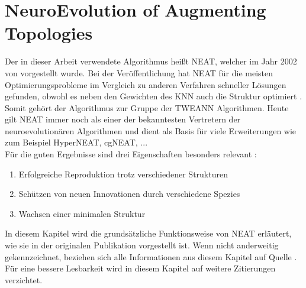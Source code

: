 \section{NeuroEvolution of Augmenting Topologies}
\label{sec:neat}
Der in dieser Arbeit verwendete Algorithmus heißt \ac{NEAT}, welcher im Jahr 2002 von \citeauthor{stanley2002evolving} vorgestellt wurde. Bei der Veröffentlichung hat \ac{NEAT} für die meisten Optimierungsprobleme im Vergleich zu anderen Verfahren schneller Lösungen gefunden, obwohl es neben den Gewichten des \ac{KNN} auch die Struktur optimiert \cite{stanley2002evolving}. Somit gehört der Algorithmus zur Gruppe der \ac{TWEANN} Algorithmen. Heute gilt \ac{NEAT} immer noch als einer der bekanntesten Vertretern der neuroevolutionären Algorithmen und dient als Basis für viele Erweiterungen wie zum Beispiel HyperNEAT, cgNEAT, ... \\
Für die guten Ergebnisse sind drei Eigenschaften besonders relevant \cite{stanley2002evolving}:
\begin{enumerate}
	\item Erfolgreiche Reproduktion trotz verschiedener Strukturen
	\item Schützen von neuen Innovationen durch verschiedene Spezies
	\item Wachsen einer minimalen Struktur
\end{enumerate}
In diesem Kapitel wird die grundsätzliche Funktionsweise von \ac{NEAT} erläutert, wie sie in der originalen Publikation vorgestellt ist. Wenn nicht anderweitig gekennzeichnet, beziehen sich alle Informationen aus diesem Kapitel auf Quelle \cite{stanley2002evolving}. Für eine bessere Lesbarkeit wird in diesem Kapitel auf weitere Zitierungen verzichtet.
